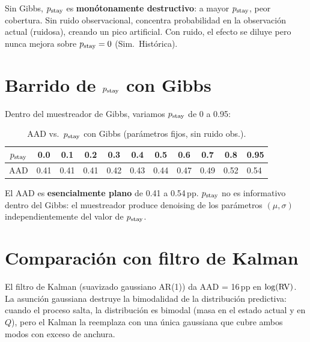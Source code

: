 Sin Gibbs, $\pstay$ es \textbf{mon\'{o}tonamente destructivo}: a mayor $\pstay$,
peor cobertura. Sin ruido observacional, concentra probabilidad en la observaci\'{o}n
actual (ruidosa), creando un pico artificial. Con ruido, el efecto se diluye pero
nunca mejora sobre $p_{\text{stay}} = 0$ (Sim.\ Hist\'{o}rica).

\section{Barrido de $\pstay$ con Gibbs}

Dentro del muestreador de Gibbs, variamos $\pstay$ de 0 a 0.95:

\begin{table}[h]
\centering
\caption{AAD vs.\ $\pstay$ con Gibbs (par\'{a}metros fijos, sin ruido obs.).}
\begin{tabular}{cccccccccc}
\toprule
$\pstay$ & 0.0 & 0.1 & 0.2 & 0.3 & 0.4 & 0.5 & 0.6 & 0.7 & 0.8 & 0.95 \\
\midrule
AAD & 0.41 & 0.41 & 0.41 & 0.42 & 0.43 & 0.44 & 0.47 & 0.49 & 0.52 & 0.54 \\
\bottomrule
\end{tabular}
\end{table}

El AAD es \textbf{esencialmente plano} de 0.41 a 0.54\,pp. $\pstay$ no es
informativo dentro del Gibbs: el muestreador produce denoising de los par\'{a}metros
$(\mu, \sigma)$ independientemente del valor de $\pstay$.

\section{Comparaci\'{o}n con filtro de Kalman}

El filtro de Kalman (suavizado gaussiano AR(1)) da AAD = 16\,pp en $\log(\operatorname{RV})$.
La asunci\'{o}n gaussiana destruye la bimodalidad de la distribuci\'{o}n predictiva:
cuando el proceso salta, la distribuci\'{o}n es bimodal (masa en el estado actual
y en $Q$), pero el Kalman la reemplaza con una \'{u}nica gaussiana que cubre
ambos modos con exceso de anchura.